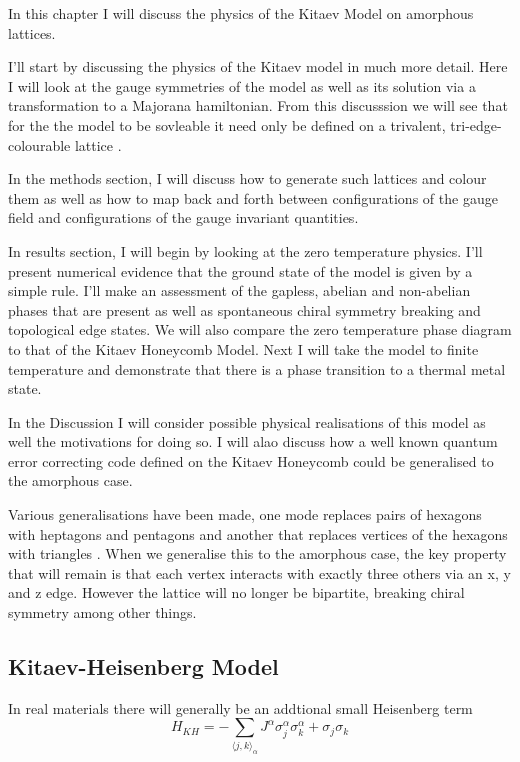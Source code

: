 In this chapter I will discuss the physics of the Kitaev Model on
amorphous lattices.

I'll start by discussing the physics of the Kitaev model in much more
detail. Here I will look at the gauge symmetries of the model as well as
its solution via a transformation to a Majorana hamiltonian. From this
discusssion we will see that for the the model to be sovleable it need
only be defined on a trivalent, tri-edge-colourable lattice
\autocite{Nussinov2009}.

In the methods section, I will discuss how to generate such lattices and
colour them as well as how to map back and forth between configurations
of the gauge field and configurations of the gauge invariant quantities.

In results section, I will begin by looking at the zero temperature
physics. I'll present numerical evidence that the ground state of the
model is given by a simple rule. I'll make an assessment of the gapless,
abelian and non-abelian phases that are present as well as spontaneous
chiral symmetry breaking and topological edge states. We will also
compare the zero temperature phase diagram to that of the Kitaev
Honeycomb Model. Next I will take the model to finite temperature and
demonstrate that there is a phase transition to a thermal metal state.

In the Discussion I will consider possible physical realisations of this
model as well the motivations for doing so. I will alao discuss how a
well known quantum error correcting code defined on the Kitaev Honeycomb
could be generalised to the amorphous case.

Various generalisations have been made, one mode replaces pairs of
hexagons with heptagons and pentagons
\cite{periNonAbelianChiralSpin2020} and another that replaces vertices
of the hexagons with triangles \cite{yaoExactChiralSpin2007}. When we
generalise this to the amorphous case, the key property that will remain
is that each vertex interacts with exactly three others via an x, y and
z edge. However the lattice will no longer be bipartite, breaking chiral
symmetry among other things.

\hypertarget{kitaev-heisenberg-model}{%
\subsection{Kitaev-Heisenberg Model}\label{kitaev-heisenberg-model}}

In real materials there will generally be an addtional small Heisenberg
term
\[H_{KH} =  - \sum_{\langle j,k\rangle_\alpha} J^{\alpha}\sigma_j^{\alpha}\sigma_k^{\alpha} + \sigma_j\sigma_k\]

